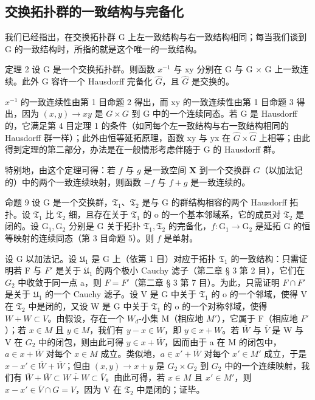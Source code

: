 \subsection{交换拓扑群的一致结构与完备化}

我们已经指出，在交换拓扑群 G 上左一致结构与右一致结构相同；每当我们谈到 G 的一致结构时，所指的就是这个唯一的一致结构。

定理 2 设 G 是一个交换拓扑群。则函数 \(x^{-1}\) 与 xy 分别在 G 与 G × G 上一致连续。此外 G 容许一个 Hausdorff 完备化 \(\hat{G}\)，且 \(\hat{G}\) 是交换的。

\(x^{-1}\) 的一致连续性由第 1 目命题 2 得出，而 xy 的一致连续性由第 1 目命题 3 得出，因为 \((x, y) \to xy\) 是 \(G \times G\) 到 G 中的一个连续同态。若 G 是 Hausdorff 的，它满足第 4 目定理 1 的条件（如同每个左一致结构与右一致结构相同的 Hausdorff 群一样）；此外由恒等延拓原理，函数 xy 与 yx 在 \(\hat{G} \times \hat{G}\) 上相等；由此得到定理的第二部分，办法是在一般情形考虑伴随于 G 的 Hausdorff 群。

特别地，由这个定理可得：若 \(f\) 与 \(g\) 是一致空间 \(\mathbf{X}\) 到一个交换群 \(G\)（以加法记的）中的两个一致连续映射，则函数 \(-f\) 与 \(f + g\) 是一致连续的。

命题 9 设 G 是一个交换群，\(\mathfrak{T}_1\)、\(\mathfrak{T}_2\) 是与 G 的群结构相容的两个 Hausdorff 拓扑。设 \(\mathfrak{T}_1\) 比 \(\mathfrak{T}_2\) 细，且存在关于 \(\mathfrak{T}_1\) 的 o 的一个基本邻域系，它的成员对 \(\mathfrak{T}_2\) 是闭的。设 \(\mathrm{G}_1, \mathrm{G}_2\) 分别是 G 关于拓扑 \(\mathfrak{T}_1, \mathfrak{T}_2\) 的完备化，\(f: \mathrm{G}_1 \to \mathrm{G}_2\) 是延拓 G 的恒等映射的连续同态（第 3 目命题 5）。则 \(f\) 是单射。

设 G 以加法记。设 \(\mathfrak{U}_{1}\) 是 G 上（依第 1 目）对应于拓扑 \(\mathfrak{T}_{1}\) 的一致结构：只需证明若 F 与 \(F'\) 是关于 \(\mathfrak{U}_{1}\) 的两个极小 Cauchy 滤子（第二章 § 3 第 2 目），它们在 \(G_{2}\) 中收敛于同一点 a，则 \(F = F'\)（第二章 § 3 第 7 目）。为此，只需证明 \(F \cap F'\) 是关于 \(\mathfrak{U}_{1}\) 的一个 Cauchy 滤子。设 V 是 G 中关于 \(\mathfrak{T}_{1}\) 的 o 的一个邻域，使得 V 在 \(\mathfrak{T}_{2}\) 中是闭的，又设 W 是 G 中关于 \(\mathfrak{T}_{1}\) 的 o 的一个对称邻域，使得 \(W + W \subset V\)。由假设，存在一个 \(W_{d}\)-小集 M（相应地 \(M'\)），它属于 F（相应地 \(F'\)）；若 \(x \in M\) 且 \(y \in M\)，我们有 \(y - x \in W\)，即 \(y \in x + W\)。若 \(\overline{W}\) 与 \(\overline{V}\) 是 W 与 V 在 \(G_{2}\) 中的闭包，则由此可得 \(y \in x + \overline{W}\)，因而由于 a 在 M 的闭包中，\(a \in x + \overline{W}\) 对每个 \(x \in M\) 成立。类似地，\(a \in x' + \overline{W}\) 对每个 \(x' \in M'\) 成立，于是 \(x - x' \in \overline{W} + \overline{W}\)；但由 \((x, y) \to x + y\) 是 \(G_{2} \times G_{2}\) 到 \(G_{2}\) 中的一个连续映射，我们有 \(\overline{W} + \overline{W} \subset \overline{W + W} \subset \overline{V}\)。由此可得，若 \(x \in M\) 且 \(x' \in M'\)，则 \(x - x' \in \overline{V} \cap G = V\)，因为 V 在 \(\mathfrak{T}_{2}\) 中是闭的；证毕。


